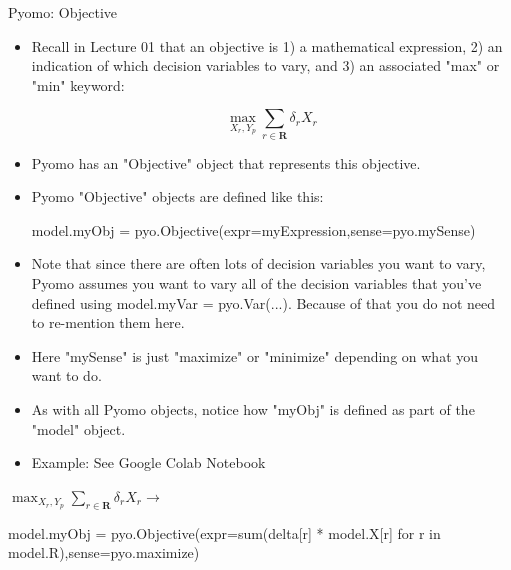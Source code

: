 \documentclass[10pt, aspectratio=169]{beamer}
\begin{document}
\begin{frame}{Pyomo: Objective}
    \begin{itemize}
        \item Recall in Lecture 01 that an objective is 1) a mathematical expression, 2) an indication of which decision variables to vary, and 3) an associated "max" or "min" keyword:
        
        $$\max_{X_r,Y_p} \sum_{r \in \textbf{R}}\delta_r X_r$$

        \item Pyomo has an "Objective" object that represents this objective.
        \item Pyomo "Objective" objects are defined like this:
        
        \hspace{0.25cm} model.myObj = pyo.Objective(expr=myExpression,sense=pyo.mySense)
    
        \item Note that since there are often lots of decision variables you want to vary, Pyomo assumes you want to vary all of the decision variables that you've defined using model.myVar = pyo.Var(...). Because of that you do not need to re-mention them here.
        \item Here "mySense" is just "maximize" or "minimize" depending on what you want to do.
        \item As with all Pyomo objects, notice how "myObj" is defined as part of the "model" object.
        \item Example: See Google Colab Notebook
    \end{itemize}

    \begin{center}
        $\max_{X_r,Y_p} \sum_{r \in \textbf{R}}\delta_r X_r \rightarrow$ 
        
        model.myObj = pyo.Objective(expr=sum(delta[r] * model.X[r] for r in model.R),sense=pyo.maximize) 
    \end{center}
\end{frame}
\end{document}
